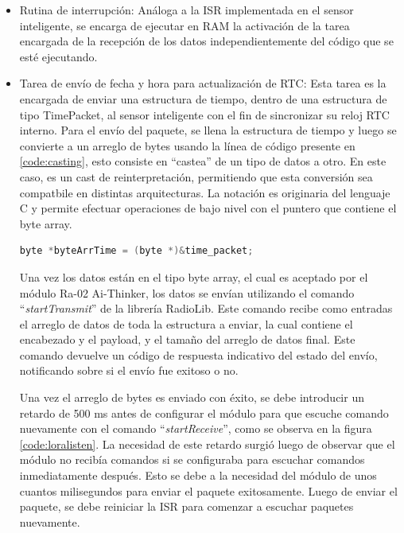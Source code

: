 \begin{itemize}
    
    \item Rutina de interrupción: Análoga a la ISR implementada en el sensor inteligente, se encarga de ejecutar en RAM la activación de la tarea encargada de la recepción de los datos independientemente del código que se esté ejecutando.
    
    \item Tarea de envío de fecha y hora para actualización de RTC: Esta tarea es la encargada de enviar una estructura de tiempo, dentro de una estructura de tipo TimePacket, al sensor inteligente con el fin de sincronizar su reloj RTC interno. Para el envío del paquete, se llena la estructura de tiempo y luego se convierte a un arreglo de bytes usando la línea de código presente en \ref{code:casting}, esto consiste en ``castea'' de un tipo de datos a otro. En este caso, es un cast de reinterpretación, permitiendo que esta conversión sea compatbile en distintas arquitecturas. La notación es originaria del lenguaje C y permite efectuar operaciones de bajo nivel con el puntero que contiene el byte array.
    
    \begin{lstlisting}[language=C++, caption=Conversión de datos a tipo byte array usando casting, label=code:casting]
        byte *byteArrTime = (byte *)&time_packet;
    \end{lstlisting}

    Una vez los datos están en el tipo byte array, el cual es aceptado por el módulo Ra-02 Ai-Thinker, los datos se envían utilizando el comando ``\textit{startTransmit}'' de la librería RadioLib. Este comando recibe como entradas el arreglo de datos de toda la estructura a enviar, la cual contiene el encabezado y el payload, y el tamaño del arreglo de datos final. Este comando devuelve un código de respuesta indicativo del estado del envío, notificando sobre si el envío fue exitoso o no.

    Una vez el arreglo de bytes es enviado con éxito, se debe introducir un retardo de 500 ms antes de configurar el módulo para que escuche comando nuevamente con el comando ``\textit{startReceive}'', como se observa en la figura \ref{code:loralisten}. La necesidad de este retardo surgió luego de observar que el módulo no recibía comandos si se configuraba para escuchar comandos inmediatamente después. Esto se debe a la necesidad del módulo de unos cuantos milisegundos para enviar el paquete exitosamente. Luego de enviar el paquete, se debe reiniciar la ISR para comenzar a escuchar paquetes nuevamente.


\end{itemize}
